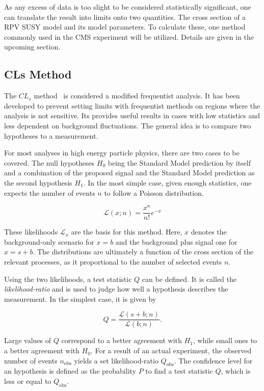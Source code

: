 As any excess of data is too slight to be considered statistically significant, one can translate the result into limits onto two quantities. The cross section of a RPV SUSY model and its model parameters. To calculate these, one method commonly used in the CMS experiment will be utilized. Details are given in the upcoming section.


\subsection{CLs Method}
\label{sec:cls-method}

The $CL_s$ method~\cite{cls,cls2} is considered a modified frequentist analysis. It has been developed to prevent setting limits with frequentist methods on regions where the analysis is not sensitive. Its provides useful results in cases with low statistics and less dependent on background fluctuations. The general idea is to compare two hypotheses to a measurement.

For most analyses in high energy particle physics, there are two cases to be covered. The null hypotheses $H_0$ being the Standard Model prediction by itself and a combination of the proposed signal and the Standard Model prediction as the second hypothesis $H_1$. In the most simple case, given enough statistics, one expects the number of events $n$ to follow a Poisson distribution.

\begin{equation}
  \label{eq:poisson-likelihood}
    \mathcal{L} (x; n) = \frac{x^n}{n!} e^{-x}
\end{equation}

\noindent These likelihoods $\mathcal{L}_x$ are the basis for this method. Here, $x$ denotes the background-only scenario for $x = b$ and the background plus signal one for $x = s + b$. The distributions are ultimately a function of the cross section of the relevant processes, as it proportional to the number of selected events $n$.

Using the two likelihoods, a test statistic $Q$ can be defined. It is called the \textit{likelihood-ratio} and is used to judge how well a hypothesis describes the measurement. In the simplest case, it is given by

\begin{equation}
  \label{eq:testq}
  Q = \frac{\mathcal{L} (s + b; n)}{\mathcal{L} (b; n)}.
\end{equation}

\noindent Large values of $Q$ correspond to a better agreement with $H_1$, while small ones to a better agreement with $H_0$. For a result of an actual experiment, the observed number of events $n_{\text{obs}}$ yields a set likelihood-ratio $Q_{\text{obs}}$. The confidence level for an hypothesis is defined as the probability $P$ to find a test statistic $Q$, which is less or equal to $Q_{\text{obs}}$. 

